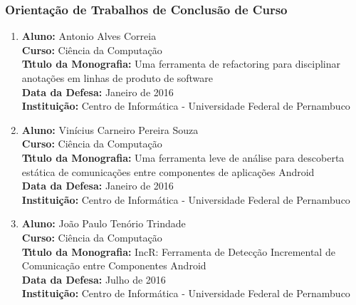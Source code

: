 \documentclass[a4paper,oneside,10pt]{article}
\begin{document}

\subsubsection{Orienta\c{c}\~{a}o de Trabalhos de Conclus\~{a}o de Curso}
\vspace{0.3cm}

\begin{enumerate}
\renewcommand{\labelenumi}{{\large\bfseries\arabic{enumi}.}}

\item       \textbf{Aluno:} Antonio Alves Correia \mbox{}\\
            \textbf{Curso:} Ciência da Computação\\
            \textbf{T\'{\i}tulo da Monografia:} Uma ferramenta de refactoring para disciplinar anotações em linhas de produto de software\\
            \textbf{Data da Defesa:} Janeiro de 2016\\
            \textbf{Institui\c{c}\~{a}o:} Centro de Informática - Universidade Federal de Pernambuco

\item       \textbf{Aluno:} Vinícius Carneiro Pereira Souza \mbox{}\\
            \textbf{Curso:} Ciência da Computação\\
            \textbf{T\'{\i}tulo da Monografia:} Uma ferramenta leve de análise para descoberta estática de comunicações entre componentes de aplicações Android\\
            \textbf{Data da Defesa:} Janeiro de 2016\\
            \textbf{Institui\c{c}\~{a}o:} Centro de Informática - Universidade Federal de Pernambuco

\item       \textbf{Aluno:} João Paulo Tenório Trindade \mbox{}\\
            \textbf{Curso:} Ciência da Computação\\
            \textbf{T\'{\i}tulo da Monografia:} IncR: Ferramenta de Detecção Incremental de Comunicação entre Componentes Android\\
            \textbf{Data da Defesa:} Julho de 2016\\
            \textbf{Institui\c{c}\~{a}o:} Centro de Informática - Universidade Federal de Pernambuco

\end{enumerate}
\end{document}
